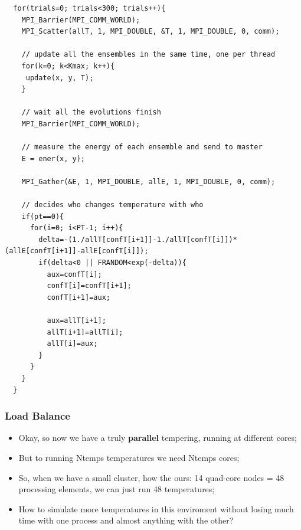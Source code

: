 \documentclass{beamer}
\begin{document}
\begin{frame}[fragile]
  \begin{tiny}
\begin{verbatim}
  for(trials=0; trials<300; trials++){
    MPI_Barrier(MPI_COMM_WORLD);
    MPI_Scatter(allT, 1, MPI_DOUBLE, &T, 1, MPI_DOUBLE, 0, comm);

    // update all the ensembles in the same time, one per thread
    for(k=0; k<Kmax; k++){ 
     update(x, y, T); 
    }

    // wait all the evolutions finish
    MPI_Barrier(MPI_COMM_WORLD);

    // measure the energy of each ensemble and send to master
    E = ener(x, y);

    MPI_Gather(&E, 1, MPI_DOUBLE, allE, 1, MPI_DOUBLE, 0, comm);
    
    // decides who changes temperature with who
    if(pt==0){
      for(i=0; i<PT-1; i++){
        delta=-(1./allT[confT[i+1]]-1./allT[confT[i]])*(allE[confT[i+1]]-allE[confT[i]]);
        if(delta<0 || FRANDOM<exp(-delta)){
          aux=confT[i];
          confT[i]=confT[i+1];
          confT[i+1]=aux;

          aux=allT[i+1];
          allT[i+1]=allT[i];
          allT[i]=aux;
        }
      }
    }
  }
\end{verbatim}
  \end{tiny}
\end{frame}

\begin{frame}
  \frametitle{Load Balance}

  \begin{itemize}
  \item Okay, so now we have a truly \textbf{parallel} tempering, running at different cores;
  \item But to running Ntemps temperatures we need Ntemps cores;
  \item So, when we have a small cluster, how the ours: 14 quad-core nodes = 48 processing elements, we can just run 48 temperatures;
  \item How to simulate more temperatures in this enviroment without losing much time with one process and almost anything with the other?
  \end{itemize}
\end{frame}
\end{document}
